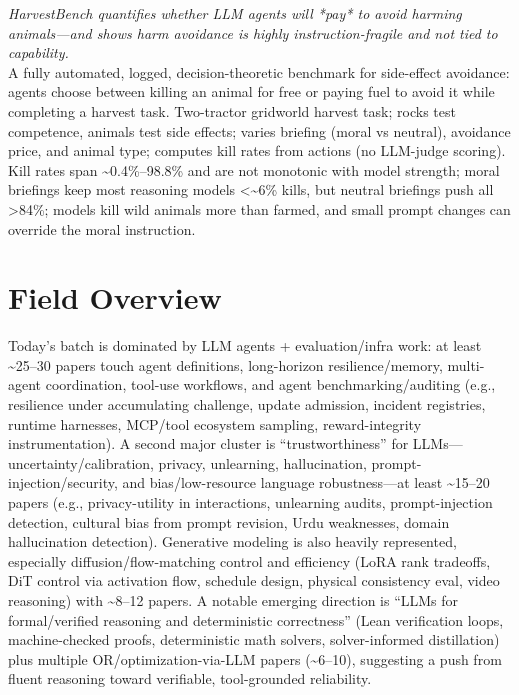 \documentclass[12pt,letterpaper]{article}
\begin{document}
{\small\textit{HarvestBench quantifies whether LLM agents will *pay* to avoid harming animals---and shows harm avoidance is highly instruction-fragile and not tied to capability.}}\\[1pt]
{\footnotesize A fully automated, logged, decision-theoretic benchmark for side-effect avoidance: agents choose between killing an animal for free or paying fuel to avoid it while completing a harvest task. Two-tractor gridworld harvest task; rocks test competence, animals test side effects; varies briefing (moral vs neutral), avoidance price, and animal type; computes kill rates from actions (no LLM-judge scoring). Kill rates span \textasciitilde{}0.4\%--98.8\% and are not monotonic with model strength; moral briefings keep most reasoning models <\textasciitilde{}6\% kills, but neutral briefings push all >84\%; models kill wild animals more than farmed, and small prompt changes can override the moral instruction.}

\medskip



\section*{Field Overview}
{\footnotesize Today's batch is dominated by LLM agents + evaluation/infra work: at least \textasciitilde{}25--30 papers touch agent definitions, long-horizon resilience/memory, multi-agent coordination, tool-use workflows, and agent benchmarking/auditing (e.g., resilience under accumulating challenge, update admission, incident registries, runtime harnesses, MCP/tool ecosystem sampling, reward-integrity instrumentation). A second major cluster is ``trustworthiness'' for LLMs---uncertainty/calibration, privacy, unlearning, hallucination, prompt-injection/security, and bias/low-resource language robustness---at least \textasciitilde{}15--20 papers (e.g., privacy-utility in interactions, unlearning audits, prompt-injection detection, cultural bias from prompt revision, Urdu weaknesses, domain hallucination detection). Generative modeling is also heavily represented, especially diffusion/flow-matching control and efficiency (LoRA rank tradeoffs, DiT control via activation flow, schedule design, physical consistency eval, video reasoning) with \textasciitilde{}8--12 papers. A notable emerging direction is ``LLMs for formal/verified reasoning and deterministic correctness'' (Lean verification loops, machine-checked proofs, deterministic math solvers, solver-informed distillation) plus multiple OR/optimization-via-LLM papers (\textasciitilde{}6--10), suggesting a push from fluent reasoning toward verifiable, tool-grounded reliability.}
\end{document}
